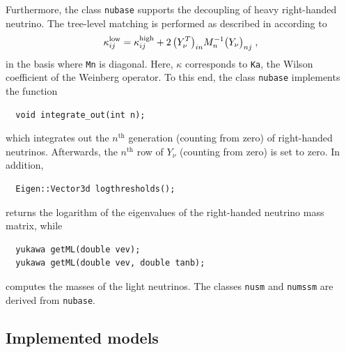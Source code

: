 \documentclass[11pt,a4paper]{article}
\begin{document}
Furthermore, the class \texttt{nubase} supports the decoupling of heavy right-handed neutrino. The tree-level matching is performed as described in \cite{Antusch:2005gp} according to
\begin{equation}
    \kappa_{ij}^{\rm low} = \kappa_{ij}^{\rm high} + 2\, \bigl(Y_\nu^T\bigr)_{in} M_n^{-1} \bigl(Y_\nu\bigr)_{nj} \;,
\end{equation}
in the basis where \texttt{Mn} is diagonal. Here, $\kappa$ corresponds to \texttt{Ka}, the Wilson coefficient of the Weinberg operator.
To this end, the class \texttt{nubase} implements the function
\begin{lstlisting}
  void integrate_out(int n);
\end{lstlisting}
which integrates out the $n^\mathrm{th}$ generation (counting from zero) of right-handed neutrinos. 
Afterwards, the $n^\mathrm{th}$ row of $Y_\nu$ (counting from zero) is set to zero.
In addition, 
\begin{lstlisting}
  Eigen::Vector3d logthresholds();
\end{lstlisting}
returns the logarithm of the eigenvalues of the right-handed neutrino mass matrix, while
\begin{lstlisting}
  yukawa getML(double vev);
  yukawa getML(double vev, double tanb);
\end{lstlisting}
computes the masses of the light neutrinos.
The classes \texttt{nusm} and \texttt{numssm} are derived from \texttt{nubase}.

\subsection{\label{sec::models} Implemented models}
\end{document}
